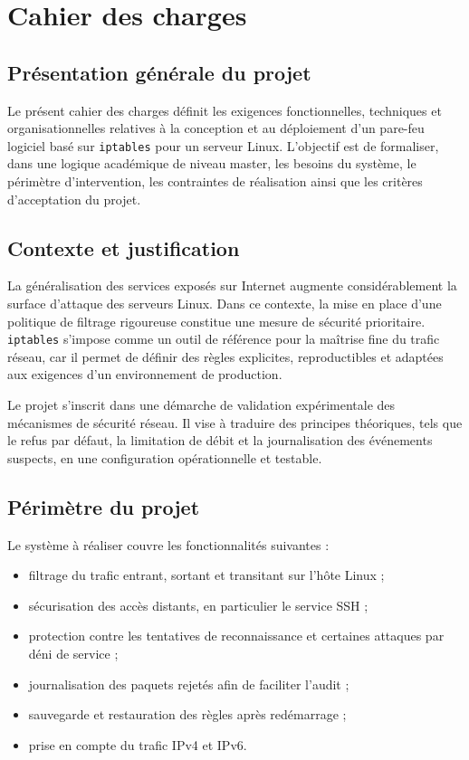 \chapter{Cahier des charges}

\section{Présentation générale du projet}

Le présent cahier des charges définit les exigences fonctionnelles, techniques et organisationnelles relatives à la conception et au déploiement d'un pare-feu logiciel basé sur \texttt{iptables} pour un serveur Linux. L'objectif est de formaliser, dans une logique académique de niveau master, les besoins du système, le périmètre d'intervention, les contraintes de réalisation ainsi que les critères d'acceptation du projet.

\section{Contexte et justification}

La généralisation des services exposés sur Internet augmente considérablement la surface d'attaque des serveurs Linux. Dans ce contexte, la mise en place d'une politique de filtrage rigoureuse constitue une mesure de sécurité prioritaire. \texttt{iptables} s'impose comme un outil de référence pour la maîtrise fine du trafic réseau, car il permet de définir des règles explicites, reproductibles et adaptées aux exigences d'un environnement de production.

Le projet s'inscrit dans une démarche de validation expérimentale des mécanismes de sécurité réseau. Il vise à traduire des principes théoriques, tels que le refus par défaut, la limitation de débit et la journalisation des événements suspects, en une configuration opérationnelle et testable.

\section{Périmètre du projet}

Le système à réaliser couvre les fonctionnalités suivantes :
\begin{itemize}
    \item filtrage du trafic entrant, sortant et transitant sur l'hôte Linux ;
    \item sécurisation des accès distants, en particulier le service SSH ;
    \item protection contre les tentatives de reconnaissance et certaines attaques par déni de service ;
    \item journalisation des paquets rejetés afin de faciliter l'audit ;
    \item sauvegarde et restauration des règles après redémarrage ;
    \item prise en compte du trafic IPv4 et IPv6.
\end{itemize}

